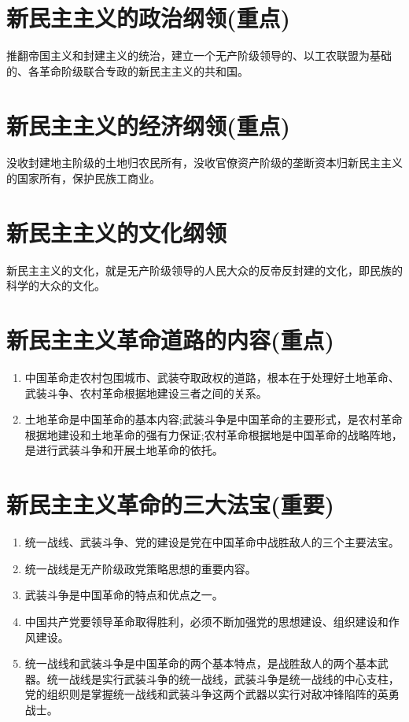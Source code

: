 \documentclass[12pt, a4paper, oneside]{ctexbook}
\begin{document}
\section{新民主主义的政治纲领(重点)}

推翻帝国主义和封建主义的统治，建立一个无产阶级领导的、以工农联盟为基础的、各革命阶级联合专政的新民主主义的共和国。

\section{新民主主义的经济纲领(重点)}

没收封建地主阶级的土地归农民所有，没收官僚资产阶级的垄断资本归新民主主义的国家所有，保护民族工商业。

\section{新民主主义的文化纲领}

新民主主义的文化，就是无产阶级领导的人民大众的反帝反封建的文化，即民族的科学的大众的文化。

\section{新民主主义革命道路的内容(重点)}

\begin{enumerate}
\item 中国革命走农村包围城市、武装夺取政权的道路，根本在于处理好土地革命、武装斗争、农村革命根据地建设三者之间的关系。

\item 土地革命是中国革命的基本内容;武装斗争是中国革命的主要形式，是农村革命根据地建设和土地革命的强有力保证;农村革命根据地是中国革命的战略阵地，是进行武装斗争和开展土地革命的依托。
\end{enumerate}

\section{新民主主义革命的三大法宝(重要)}

\begin{enumerate}
\item 统一战线、武装斗争、党的建设是党在中国革命中战胜敌人的三个主要法宝。

\item 统一战线是无产阶级政党策略思想的重要内容。

\item 武装斗争是中国革命的特点和优点之一。

\item 中国共产党要领导革命取得胜利，必须不断加强党的思想建设、组织建设和作风建设。

\item 统一战线和武装斗争是中国革命的两个基本特点，是战胜敌人的两个基本武器。统一战线是实行武装斗争的统一战线，武装斗争是统一战线的中心支柱，党的组织则是掌握统一战线和武装斗争这两个武器以实行对敌冲锋陷阵的英勇战士。
\end{enumerate}
\end{document}
